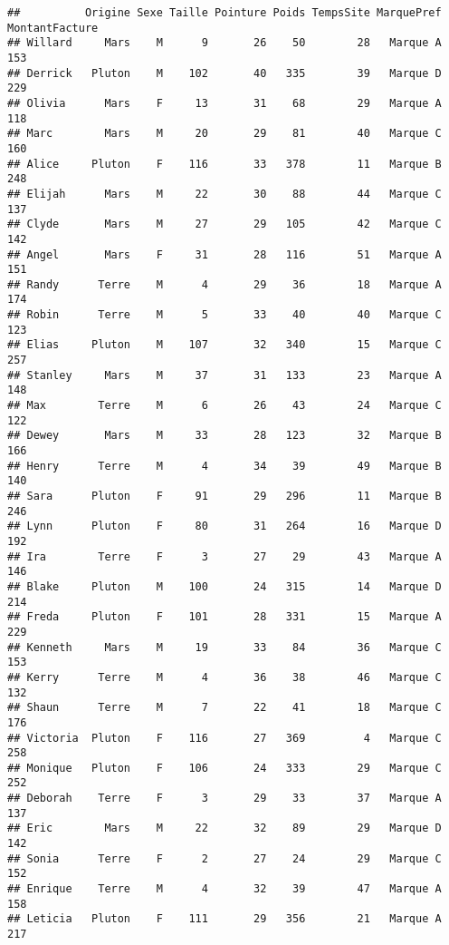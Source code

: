 \documentclass[]{article}
\begin{document}
\begin{verbatim}
##          Origine Sexe Taille Pointure Poids TempsSite MarquePref MontantFacture
## Willard     Mars    M      9       26    50        28   Marque A            153
## Derrick   Pluton    M    102       40   335        39   Marque D            229
## Olivia      Mars    F     13       31    68        29   Marque A            118
## Marc        Mars    M     20       29    81        40   Marque C            160
## Alice     Pluton    F    116       33   378        11   Marque B            248
## Elijah      Mars    M     22       30    88        44   Marque C            137
## Clyde       Mars    M     27       29   105        42   Marque C            142
## Angel       Mars    F     31       28   116        51   Marque A            151
## Randy      Terre    M      4       29    36        18   Marque A            174
## Robin      Terre    M      5       33    40        40   Marque C            123
## Elias     Pluton    M    107       32   340        15   Marque C            257
## Stanley     Mars    M     37       31   133        23   Marque A            148
## Max        Terre    M      6       26    43        24   Marque C            122
## Dewey       Mars    M     33       28   123        32   Marque B            166
## Henry      Terre    M      4       34    39        49   Marque B            140
## Sara      Pluton    F     91       29   296        11   Marque B            246
## Lynn      Pluton    F     80       31   264        16   Marque D            192
## Ira        Terre    F      3       27    29        43   Marque A            146
## Blake     Pluton    M    100       24   315        14   Marque D            214
## Freda     Pluton    F    101       28   331        15   Marque A            229
## Kenneth     Mars    M     19       33    84        36   Marque C            153
## Kerry      Terre    M      4       36    38        46   Marque C            132
## Shaun      Terre    M      7       22    41        18   Marque C            176
## Victoria  Pluton    F    116       27   369         4   Marque C            258
## Monique   Pluton    F    106       24   333        29   Marque C            252
## Deborah    Terre    F      3       29    33        37   Marque A            137
## Eric        Mars    M     22       32    89        29   Marque D            142
## Sonia      Terre    F      2       27    24        29   Marque C            152
## Enrique    Terre    M      4       32    39        47   Marque A            158
## Leticia   Pluton    F    111       29   356        21   Marque A            217
\end{verbatim}
\end{document}
